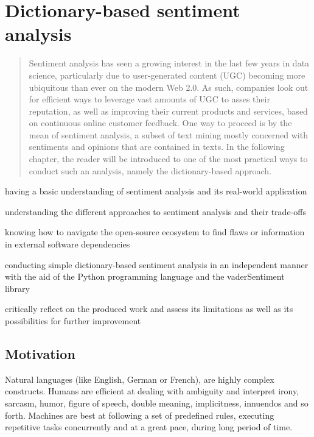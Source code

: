 	\chapter{Dictionary-based sentiment analysis}\label{ch:topic1}
	
	\begin{abstract}
		Sentiment analysis has seen a growing interest in the last few years in data science, particularly due to user-generated content (UGC) becoming more ubiquitous than ever on the modern Web 2.0. As such, companies look out for efficient ways to leverage vast amounts of UGC to asses their reputation, as well as improving their current products and services, based on continuous online customer feedback. One way to proceed is by the mean of sentiment analysis, a subset of text mining mostly concerned with sentiments and opinions that are contained in texts. In the following chapter, the reader will be introduced to one of the most practical ways to conduct such an analysis, namely the dictionary-based approach.
	\end{abstract}
	
	\begin{goals}
		\item having a basic understanding of sentiment analysis and its real-world application
		\item understanding the different approaches to sentiment analysis and their trade-offs
		\item knowing how to navigate the open-source ecosystem to find flaws or information in external software dependencies
		\item conducting simple dictionary-based sentiment analysis in an independent manner with the aid of the Python programming language and the vaderSentiment library
		\item critically reflect on the produced work and assess its limitations as well as its possibilities for further improvement
	\end{goals}
	
	\section{Motivation}
	Natural languages (like English, German or French), are highly complex constructs. Humans are efficient at dealing with ambiguity and interpret irony, sarcasm, humor, figure of speech, double meaning, implicitness, innuendos and so forth. Machines are best at following a set of predefined rules, executing repetitive tasks concurrently and at a great pace, during long period of time.
	
